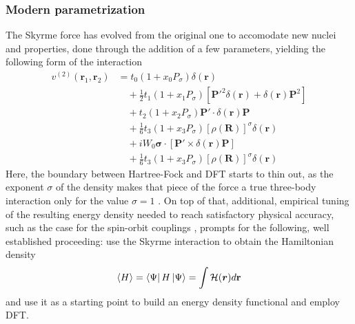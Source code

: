 \subsubsection{Modern parametrization}
The Skyrme force has evolved from the original one to accomodate new nuclei and properties, done through the addition of a few parameters, yielding the following form of the interaction \cite{CHABANAT1997710}
    \begin{align*}
v^{(2)}(\mathbf{r}_1, \mathbf{r}_2) &= t_0 \left(1 + x_0 P_\sigma \right) \delta(\mathbf{r}) \\
&\quad + \frac{1}{2} t_1 \left(1 + x_1 P_\sigma \right) \left[ \mathbf{P}'^2 \delta(\mathbf{r}) + \delta(\mathbf{r}) \mathbf{P}^2 \right] \\
&\quad + t_2 \left(1 + x_2 P_\sigma \right) \mathbf{P}' \cdot \delta(\mathbf{r}) \mathbf{P} \\
&\quad + \frac{1}{6} t_3 \left(1 + x_3 P_\sigma \right) \left[ \rho(\mathbf{R}) \right]^\sigma \delta(\mathbf{r}) \\
&\quad + i W_0 \boldsymbol{\sigma}\cdot \left[ \mathbf{P}' \times \delta(\mathbf{r}) \mathbf{P} \right]\\
&\quad + \frac 1 6 t_3 \left(1 + x_3 P_\sigma \right) \left[ \rho(\mathbf{R}) \right]^\sigma \delta(\mathbf{r}) 
\end{align*}
Here, the boundary between Hartree-Fock and DFT starts to thin out, as the exponent $\sigma$ of the density makes that piece of the force a true three-body interaction only for the value $\sigma=1$ \cite{Erler_2010}.
On top of that, additional, empirical tuning of the resulting energy density needed to reach satisfactory physical accuracy, such as the case for the spin-orbit couplings \cite{REINHARD1995467}, prompts for the following, well established proceeding: use the Skyrme interaction to obtain the Hamiltonian density 
\begin{equation}
    \label{eq:skyrme_int_en_dens}
    \expval{H} = \bra{\Psi} H \ket{\Psi} = \int \mathcal H(\bm r) d\mathbf r
\end{equation}
and use it as a starting point to build an energy density functional and employ DFT.